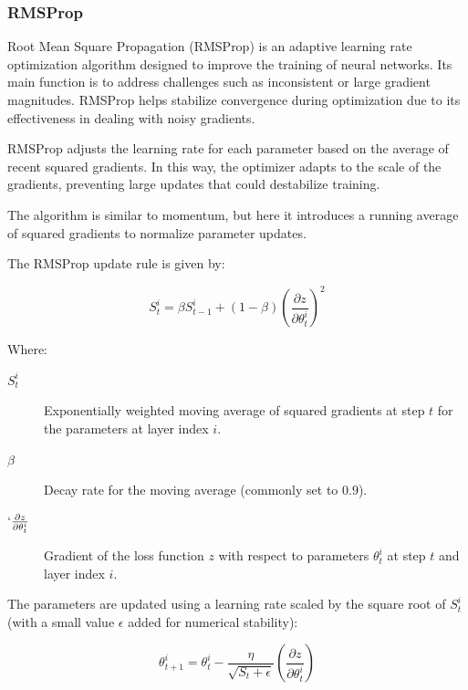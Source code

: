 		\bigskip
		\subsubsection{RMSProp}
		\label{section:RMSProp}
		
		Root Mean Square Propagation (RMSProp) is an adaptive learning rate optimization algorithm designed to improve the training of neural networks. Its main function is to address challenges such as inconsistent or large gradient magnitudes. RMSProp helps stabilize convergence during optimization due to its effectiveness in dealing with noisy gradients.
		
		RMSProp adjusts the learning rate for each parameter based on the average of recent squared gradients. In this way, the optimizer adapts to the scale of the gradients, preventing large updates that could destabilize training.  
		
		The algorithm is similar to momentum, but here it introduces a running average of squared gradients to normalize parameter updates.
		
		The RMSProp update rule is given by:
		
		\begin{equation}
			S^i_t = \beta S^i_{t-1} + (1 - \beta) \left( \frac{\partial z}{\partial \theta^i_{t}} \right)^2
		\end{equation}

		
		Where:
		\begin{description}
			\item[$S^i_t$] Exponentially weighted moving average of squared gradients at step $t$ for the parameters at layer index $i$.
			\item[$\beta$] Decay rate for the moving average (commonly set to $0.9$).
			\item[$`\frac{\partial z}{\partial \theta^i_{t}}$] Gradient of the loss function $z$ with respect to parameters $\theta^i_t$ at step $t$ and layer index $i$.
		\end{description}
		\bigskip
		
		
		The parameters are updated using a learning rate scaled by the square root of $S^i_t$ (with a small value $\epsilon$ added for numerical stability):
		
		\begin{equation}
			\theta^i_{t+1} = \theta^i_t - \frac{\eta}{\sqrt{S_t + \epsilon}} 
			\left( \frac{\partial z}{\partial \theta^i_{t}} \right)
		\end{equation}
		
